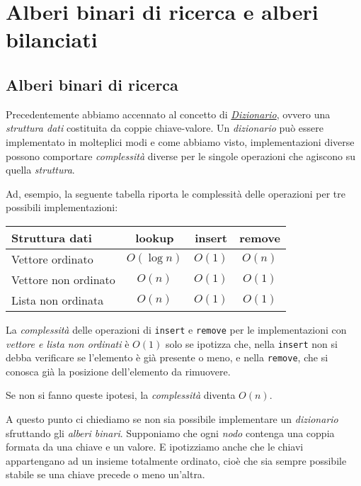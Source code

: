 \chapter{Alberi binari di ricerca e alberi bilanciati}
\section{Alberi binari di ricerca}
Precedentemente abbiamo accennato al concetto di \hyperref[def:39]
{\emph{Dizionario}}, ovvero una \emph{struttura dati} costituita da coppie
chiave-valore. Un \emph{dizionario} può essere implementato in molteplici modi e
come abbiamo visto, implementazioni diverse possono comportare \emph{complessità}
diverse per le singole operazioni che agiscono su quella \emph{struttura}.

Ad, esempio, la seguente tabella riporta le complessità delle operazioni per
tre possibili implementazioni:
\begin{table}[h]
    \renewcommand{\arraystretch}{1.2}
    \centering
    \begin{tabular}{|l|c|c|c|}
        \hline
        \textbf{Struttura dati} & \textbf{lookup} & \textbf{insert} & \textbf{remove}\\
        \hline
        Vettore ordinato & $O(\log n)$ & $O(1)$ & $O(n)$\\
        \hline
        Vettore non ordinato & $O(n)$ & $O(1)$ & $O(1)$\\
        \hline
        Lista non ordinata & $O(n)$ & $O(1)$ & $O(1)$\\
        \hline
    \end{tabular}
\end{table}

\begin{note}
    La \emph{complessità} delle operazioni di \texttt{insert} e \texttt{remove}
    per le implementazioni con \emph{vettore e lista non ordinati} è $O(1)$
    solo se ipotizza che, nella \texttt{insert} non si debba verificare se
    l'elemento è già presente o meno, e nella \texttt{remove}, che si conosca
    già la posizione dell'elemento da rimuovere.

    Se non si fanno queste ipotesi, la \emph{complessità} diventa $O(n)$.
\end{note}\noindent
A questo punto ci chiediamo se non sia possibile implementare un \emph{dizionario}
sfruttando gli \emph{alberi binari}. Supponiamo che ogni \emph{nodo}
contenga una coppia formata da una chiave e un valore. E ipotizziamo anche che
le chiavi appartengano ad un insieme totalmente ordinato, cioè che sia sempre
possibile stabile se una chiave precede o meno un'altra.

